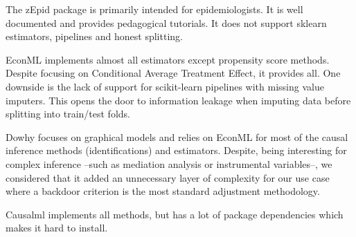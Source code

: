 \documentclass[10pt,letterpaper]{article}
\begin{document}
The zEpid package is primarily intended for epidemiologists. It is well documented
and provides pedagogical tutorials. It does not support sklearn estimators,
pipelines and honest splitting.

EconML \cite{battocchi2019econml} implements almost all estimators except propensity score methods. Despite
focusing on Conditional Average Treatment Effect, it provides all. One downside
is the lack of support for scikit-learn pipelines with missing value imputers.
This opens the door to information leakage when imputing data before splitting
into train/test folds.

Dowhy \cite{sharma2020dowhy} focuses on graphical models and relies on EconML for most of the causal
inference methods (identifications) and estimators. Despite, being interesting
for complex inference --such as mediation analysis or instrumental variables--,
we considered that it added an unnecessary layer of complexity for our use case
where a backdoor criterion is the most standard adjustment methodology.

Causalml implements all methods, but has a lot of package dependencies
which makes it hard to install.
\end{document}
